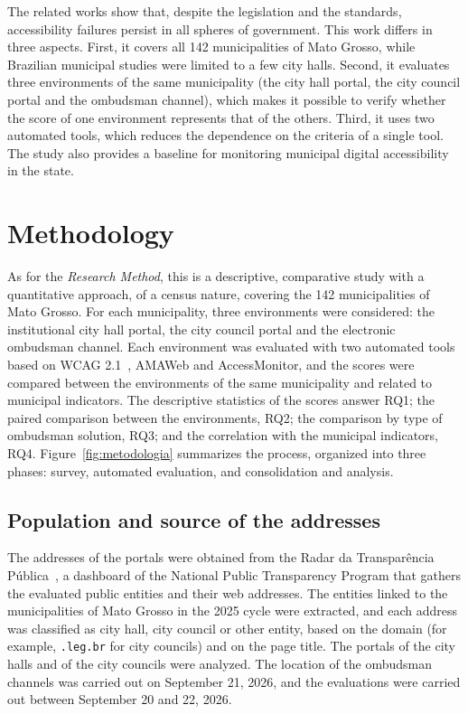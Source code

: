 \documentclass[12pt]{article}
\begin{document}
The related works show that, despite the legislation and the standards, accessibility failures persist in all spheres of government. This work differs in three aspects. First, it covers all 142 municipalities of Mato Grosso, while Brazilian municipal studies were limited to a few city halls. Second, it evaluates three environments of the same municipality (the city hall portal, the city council portal and the ombudsman channel), which makes it possible to verify whether the score of one environment represents that of the others. Third, it uses two automated tools, which reduces the dependence on the criteria of a single tool. The study also provides a baseline for monitoring municipal digital accessibility in the state.


\section{Methodology}
\label{sec:metodologia}

As for the \textit{Research Method}, this is a descriptive, comparative study with a quantitative approach, of a census nature, covering the 142 municipalities of Mato Grosso. For each municipality, three environments were considered: the institutional city hall portal, the city council portal and the electronic ombudsman channel. Each environment was evaluated with two automated tools based on WCAG 2.1~\cite{wcag21}, AMAWeb and AccessMonitor, and the scores were compared between the environments of the same municipality and related to municipal indicators. The descriptive statistics of the scores answer RQ1; the paired comparison between the environments, RQ2; the comparison by type of ombudsman solution, RQ3; and the correlation with the municipal indicators, RQ4. Figure~\ref{fig:metodologia} summarizes the process, organized into three phases: survey, automated evaluation, and consolidation and analysis.



\subsection{Population and source of the addresses}

The addresses of the portals were obtained from the Radar da Transparência Pública~\cite{radar}, a dashboard of the National Public Transparency Program that gathers the evaluated public entities and their web addresses. The entities linked to the municipalities of Mato Grosso in the 2025 cycle were extracted, and each address was classified as city hall, city council or other entity, based on the domain (for example, \texttt{.leg.br} for city councils) and on the page title. The portals of the city halls and of the city councils were analyzed. The location of the ombudsman channels was carried out on September 21, 2026, and the evaluations were carried out between September 20 and 22, 2026.
\end{document}
